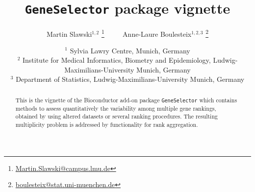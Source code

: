 


\title{\texttt{GeneSelector} package vignette}
\author{Martin Slawski$^{1,2}$ \footnote{\url{Martin.Slawski@campus.lmu.de}} $\qquad$
        Anne-Laure Boulesteix$^{1,2,3}$ \footnote{\url{boulesteix@stat.uni-muenchen.de}}}

\usepackage{Sweave}

\date{\normalsize{$^1$ Sylvia Lawry Centre, Munich, Germany \\
                  $^2$  Institute for Medical Informatics, Biometry and
                  Epidemiology, Ludwig-Maximilians-University Munich,
                  Germany \\
                  $^3$ Department of Statistics, Ludwig-Maximilians-University Munich, Germany}}
\maketitle



\begin{abstract}
This is the vignette of the Bioconductor add-on package
\texttt{GeneSelector} which contains methods to assess quantitatively
the variability among multiple gene rankings, obtained by
using altered datasets or several ranking procedures. The resulting multiplicity
problem is addressed by functionality for rank aggregation. 
\end{abstract}


